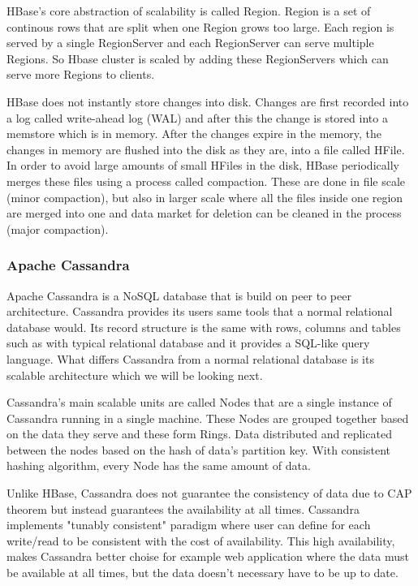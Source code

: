 HBase's core abstraction of scalability is called Region.
Region is a set of continous rows that are split when one Region grows too large.
Each region is served by a single RegionServer and each RegionServer can serve multiple Regions.
So Hbase cluster is scaled by adding these RegionServers which can serve more Regions to clients. \cite{george}

HBase does not instantly store changes into disk. 
Changes are first recorded into a log called write-ahead log (WAL) and after this the change is stored into a memstore which is in memory.
After the changes expire in the memory, the changes in memory are flushed into the disk as they are, into a file called HFile. 
In order to avoid large amounts of small HFiles in the disk, HBase periodically merges these files using a process called compaction.
These are done in file scale (minor compaction), but also in larger scale where all the files inside one region are merged into one and data market for deletion can be cleaned in the process (major compaction). \cite{george}

\subsubsection{Apache Cassandra}

Apache Cassandra is a NoSQL database that is build on peer to peer architecture.
Cassandra provides its users same tools that a normal relational database would.
Its record structure is the same with rows, columns and tables such as with typical relational database and it provides a SQL-like query language.
What differs Cassandra from a normal relational database is its scalable architecture which we will be looking next. \cite{yarabarla}

Cassandra's main scalable units are called Nodes that are a single instance of Cassandra running in a single machine.
These Nodes are grouped together based on the data they serve and these form Rings.
Data distributed and replicated between the nodes based on the hash of data's partition key.
With consistent hashing algorithm, every Node has the same amount of data. \cite{neeraj}

Unlike HBase, Cassandra does not guarantee the consistency of data due to CAP theorem but instead guarantees the availability at all times.
Cassandra implements "tunably consistent" paradigm where user can define for each write/read to be consistent with the cost of availability.
This high availability, makes Cassandra better choise for example web application where the data must be available at all times, but the data doesn't necessary have to be up to date. \cite{neeraj}

